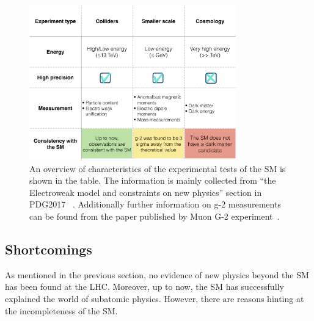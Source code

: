\begin{figure}[!h]
\centering
  \includegraphics[width=0.8\textwidth]{Plots/SM/experiments.pdf}
  \caption[The experimental tests of the SM]{ An overview of characteristics of the experimental tests of the SM is shown in the table. 
  The information is mainly collected from ``the Electroweak model and constraints on new physics'' section in PDG2017~\cite{Olive:2016xmw} . Additionally further information on g-2 measurements can be found from the paper published by Muon G-2 experiment~\cite{g2}.}
  \label{tab:SM_tests}
\end{figure}

\subsection{Shortcomings}
\label{sec:shortcomingsOfSM}
As mentioned in the previous section, no evidence of new physics beyond the SM has been found at the LHC. Moreover, up to now, the SM has successfully explained the world of subatomic physics. However, there are reasons hinting at the incompleteness of the SM.
